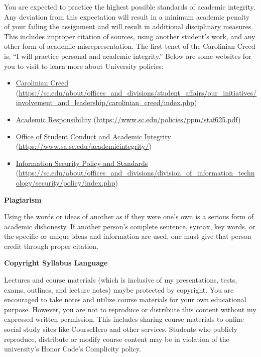 \documentclass[11pt,letterpaper]{article}
\begin{document}
You are expected to practice the highest possible standards of academic integrity. Any deviation from this expectation will result in a minimum academic penalty of your failing the assignment and will result in additional disciplinary measures. This includes improper citation of sources, using another student's work, and any other form of academic misrepresentation. The first tenet of the Carolinian Creed is, ``I will practice personal and academic integrity.'' Below are some websites for you to visit to learn more about University policies:
	\begin{itemize}
	\item \href{https://sc.edu/about/offices\_and\_divisions/student\_affairs/our\_initiatives/involvement\_and\_leadership/carolinian\_creed/index.php}{Carolinian Creed} (\url{https://sc.edu/about/offices\_and\_divisions/student\_affairs/our\_initiatives/involvement\_and\_leadership/carolinian\_creed/index.php})
	\item \href{https://www.sc.edu/policies/ppm/staf625.pdf}{Academic Responsibility} (\url{https://www.sc.edu/policies/ppm/staf625.pdf})
	\item \href{https://www.sa.sc.edu/academicintegrity/}{Office of Student Conduct and Academic Integrity} (\url{https://www.sa.sc.edu/academicintegrity/})
	\item \href{https://sc.edu/about/offices\_and\_divisions/division\_of\_information\_technology/security/policy/index.php}{Information Security Policy and Standards} (\url{https://sc.edu/about/offices\_and\_divisions/division\_of\_information\_technology/security/policy/index.php})
	\end{itemize} \pvspace{0.1cm}

{\bfseries Plagiarism} \par
Using the words or ideas of another as if they were one's own is a serious form of academic dishonesty. If another person’s complete sentence, syntax, key words, or the specific or unique ideas and information are used, one must give that person credit through proper citation. \pspace

{\bfseries Copyright Syllabus Language} \par
Lectures and course materials (which is inclusive of my presentations, tests, exams, outlines, and lecture notes) maybe protected by copyright. You are encouraged to take notes and utilize course materials for your own educational purpose. However, you are not to reproduce or distribute this content without my expressed written permission. This includes sharing course materials to online social study sites like CourseHero and other services. Students who publicly reproduce, distribute or modify course content may be in violation of the university's Honor Code’s Complicity policy. \pspace
\end{document}
